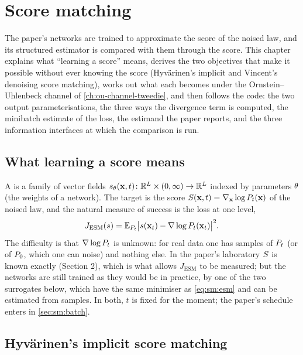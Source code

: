 \chapter{Score matching}
\label{ch:score-matching}

The paper's networks are trained to approximate the score of the noised law, and its
structured estimator is compared with them through the score. This chapter explains
what ``learning a score'' means, derives the two objectives that make it possible
without ever knowing the score (Hyv\"arinen's implicit and Vincent's denoising score
matching), works out what each becomes under the Ornstein--Uhlenbeck channel of
\cref{ch:ou-channel-tweedie}, and then follows the code: the two output
parameterisations, the three ways the divergence term is computed, the minibatch
estimate of the loss, the estimand the paper reports, and the three information
interfaces at which the comparison is run.

\section{What learning a score means}
\label{sec:sm:meaning}

A  is a family of vector fields $s_\theta(\mathbf{x},t)\colon\mathbb{R}^{L}\times(0,\infty)\to\mathbb{R}^{L}$
indexed by parameters $\theta$ (the weights of a network). The target is the score
$S(\mathbf{x},t)=\nabla_{\mathbf{x}}\log P_t(\mathbf{x})$ of the noised law, and the natural measure of
success is the  loss at one level,
\begin{equation}
  J_{\mathrm{ESM}}(s)=\mathbb{E}_{P_t}\bigl|s(\mathbf{x}_t)-\nabla\log P_t(\mathbf{x}_t)\bigr|^2 .
  \label{eq:sm:esm}
\end{equation}
The difficulty is that $\nabla\log P_t$ is unknown: for real data one has samples of
$P_t$ (or of $P_0$, which one can noise) and nothing else. In the paper's laboratory
$S$ is known exactly (Section 2), which is what allows $J_{\mathrm{ESM}}$ to be
measured; but the networks are still trained as they would be in practice, by one of
the two surrogates below, which have the same minimiser as \cref{eq:sm:esm} and can be
estimated from samples. In both, $t$ is fixed for the moment; the paper's schedule
enters in \cref{sec:sm:batch}.

\section{Hyv\"arinen's implicit score matching}
\label{sec:sm:ism}


